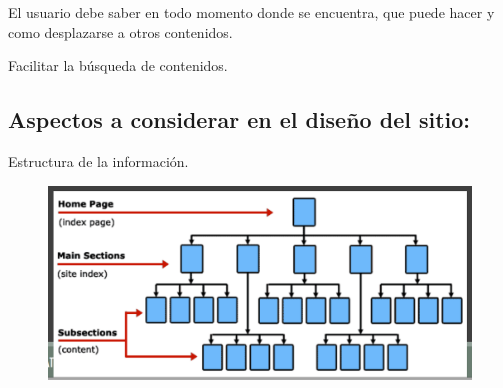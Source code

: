 \documentclass[12pt, twoside, openright]{report} %
\begin{document}
    El usuario debe saber en todo momento donde se encuentra, que
    puede hacer y como desplazarse a otros contenidos.

    Facilitar la búsqueda de contenidos.

    
\subsection{Aspectos a considerar en el diseño del sitio:}

Estructura de la información.
\begin{figure}[H]
  {\includegraphics[scale=.3]{Untitled 6.png}}
\end{figure}
\end{document}
